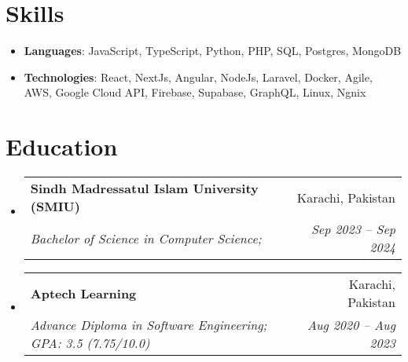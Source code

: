 \documentclass[letterpaper,11pt]{article}
\makeatletter
\newcommand{\resumeSubheading}[4]{
  \vspace{-1pt}\item
    \begin{tabular*}{0.97\textwidth}[t]{l@{\extracolsep{\fill}}r}
      \textbf{#1} & #2 \\
      \textit{\small#3} & \textit{\small #4} \\
    \end{tabular*}\vspace{-5pt}
}
\newcommand{\resumeSubHeadingListStart}{\begin{itemize}[leftmargin=*]}
\newcommand{\resumeSubHeadingListEnd}{\end{itemize}}
\makeatother
\begin{document}
%
\section{Skills}
 \resumeSubHeadingListStart
   \item{\textbf{Languages}{: JavaScript, TypeScript, Python, PHP, SQL, Postgres, MongoDB}}
   \item{\textbf{Technologies}{: React, NextJs, Angular, NodeJs, Laravel, Docker, Agile, AWS, Google Cloud API, Firebase, Supabase, GraphQL, Linux, Ngnix}}
 \resumeSubHeadingListEnd



\section{Education}
\resumeSubHeadingListStart
  \resumeSubheading
    {Sindh Madressatul Islam University (SMIU)}{Karachi, Pakistan}
    {Bachelor of Science in Computer Science;}{Sep 2023 -- Sep 2024}
  \resumeSubheading
    {Aptech Learning}{Karachi, Pakistan}
    {Advance Diploma in Software Engineering; GPA: 3.5 (7.75/10.0)}{Aug 2020 -- Aug 2023}
\resumeSubHeadingListEnd


\end{document}
